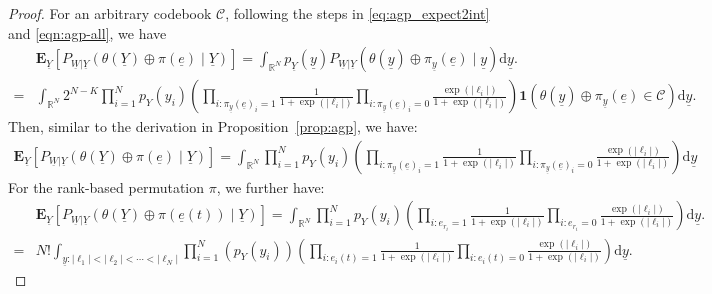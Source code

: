 \documentclass[letterpaper,draftclsnofoot,onecolumn]{IEEEtran}
\begin{document}
\begin{proof}
    For an arbitrary codebook $\mathcal{C}$, following the steps in \eqref{eq:agp_expect2int} and \eqref{eqn:agp-all}, we have 
    \begin{align}
        & \mathbf{E}_{\underline{Y}} \left[P_{\underline{W}|\underline{Y}}(\theta(\underline{Y})\oplus \pi(\underline{e}) \mid \underline{Y})\right] = \int_{\mathbb{R}^N} p_{\underline{Y}}(\underline{y}) P_{\underline{W}|\underline{Y}}(\theta(\underline{y})\oplus \pi_{\underline{y}}(\underline{e}) \mid \underline{y})
        \mathrm{d}\underline{y}.  \\
        = &\int_{\mathbb{R}^N} 2^{N - K} \prod_{i=1}^{N}p_{Y}(y_i) \left(\prod_{i:\pi_{\underline{y}}(\underline{e})_i = 1} \frac{1}{1+\exp(|\ell_i|)} \prod_{i:\pi_{\underline{y}}(\underline{e})_i = 0} \frac{\exp(|\ell_i|)} {1+\exp(|\ell_i|)}\right) \mathbf{1}\left(\theta(\underline{y}) \oplus \pi_{\underline{y}}(\underline{e}) \in \mathcal{C}\right) \mathrm{d}\underline{y}. 
    \end{align}
    Then, similar to the derivation in Proposition~\ref{prop:agp}, we have:
    \begin{eqnarray}\label{eq:Long4.1}
        \mathbf{E}_{\underline{Y}} \left[P_{\underline{W}|\underline{Y}}(\theta(\underline{Y})\oplus \pi(\underline{e}) \mid \underline{Y})\right] = \int_{\mathbb{R}^N}\prod_{i=1}^{N}p_{Y}(y_i)\left(\prod_{i:\pi_{\underline{y}}(\underline{e})_i = 1 } \frac{1}{1+\exp(|\ell_i|)} \prod_{i:\pi_{\underline{y}}(\underline{e})_i = 0} \frac{\exp(|\ell_i|)} {1+\exp(|\ell_i|)}\right)\mathrm{d}\underline{y}
    \end{eqnarray}
    For the rank-based permutation $\pi$, we further have:
    \begin{align}
        & \mathbf{E}_{\underline{Y}} \left[P_{\underline{W}|\underline{Y}}(\theta(\underline{Y})\oplus \pi(\underline{e}(t)) \mid \underline{Y})\right] = \int_{\mathbb{R}^N}\prod_{i=1}^{N}p_{Y}(y_{i})\left(\prod_{i:e_{r_i} = 1} \frac{1}{1+\exp(|\ell_i|)} \prod_{i:e_{r_i} = 0} \frac{\exp(|\ell_i|)}{1+\exp(|\ell_i|)}\right)\mathrm{d}\underline{y}.\label{eq:Long4.2} \\
        = & N!\int_{\underline{y}:|\ell_{1}|<|\ell_{2}|<\cdots<|\ell_{N}|}\prod_{i=1}^{N}(p_{Y}(y_i))\left(\prod_{i:e_i(t) = 1} \frac{1}{1+\exp(|\ell_i|)} \prod_{i:e_i(t) = 0} \frac{\exp(|\ell_i|)}{1+\exp(|\ell_i|)}\right)\mathrm{d}\underline{y}.\label{eq:Long4.3}
    \end{align}


\end{proof}
\end{document}
